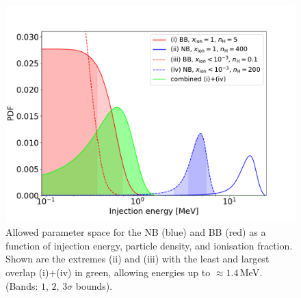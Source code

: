\documentclass[doublespace,nopageskip]{VTthesis} %
\begin{document}
	
	\begin{figure}
		\centering
		\includegraphics[width=0.8\columnwidth,trim=0.0in 0.25in 1.0in 0.9in, clip=true]{Figures/511keV/bulge_blur_Einj_pdfs_overlaps_combined.pdf}%
		\caption{Allowed parameter space for the NB (blue) and BB (red) as a function of injection energy, particle density, and ionisation fraction. Shown are the extremes (ii) and (iii) with the least and largest overlap (i)+(iv) in green, allowing energies up to $\approx 1.4$\,MeV. (Bands: $1$, $2$, $3\sigma$ bounds).}%
		\label{fig:limits_Einj}%
	\end{figure}
	
	
\end{document}
